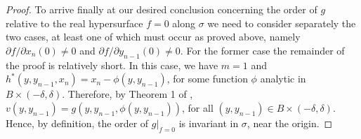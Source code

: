 \documentclass{article}
\begin{document}
\begin{proof}
    To arrive finally at our desired conclusion 
    concerning the order of $g$
    relative to the real hypersurface $f = 0$ along $\sigma$
    we need to consider separately the two cases,
    at least one of which must occur as proved above, namely
    $\partial f/\partial x_n(0) \neq 0$ and 
    $\partial f/\partial y_{n-1} (0) \neq 0$.
    For the former case the remainder of the proof is relatively short.
    In this case, we have $m = 1$ and 
    $h^*(y, y_{n-1}, x_n) = x_n - \phi(y, y_{n-1})$,
    for some function $\phi$ analytic in $B \times (-\delta, \delta)$.
    Therefore, by Theorem 1 of \cite{Loos1982}, 
    $v(y, y_{n-1}) = g(y, y_{n-1}, \phi(y, y_{n-1}))$,
    for all $(y, y_{n-1}) \in B \times (-\delta, \delta)$.
    Hence, by definition, the order of $g|_{f=0}$ is invariant in
    $\sigma$, near the origin.


\end{proof}
\end{document}
